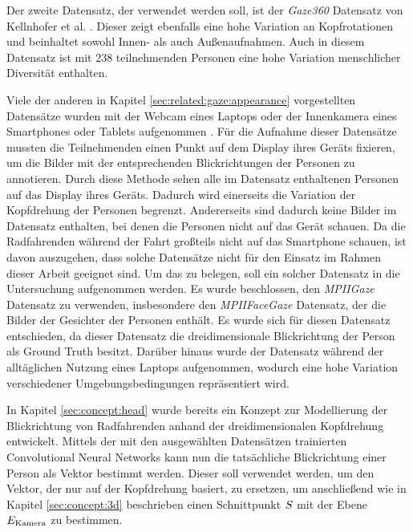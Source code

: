 Der zweite Datensatz, der verwendet werden soll, ist der \textit{Gaze360} Datensatz von Kellnhofer et al. \cite{paper:gaze360}. Dieser zeigt ebenfalls eine hohe Variation an Kopfrotationen und beinhaltet sowohl Innen- als auch Außenaufnahmen. Auch in diesem Datensatz ist mit 238 teilnehmenden Personen eine hohe Variation menschlicher Diversität enthalten.

Viele der anderen in Kapitel \ref{sec:related:gaze:appearance} vorgestellten Datensätze wurden mit der Webcam eines Laptops oder der Innenkamera eines Smartphones oder Tablets aufgenommen \cite{paper:mpiigaze, paper:gazecapture, paper:tabletgaze}. Für die Aufnahme dieser Datensätze mussten die Teilnehmenden einen Punkt auf dem Display ihres Geräts fixieren, um die Bilder mit der entsprechenden Blickrichtungen der Personen zu annotieren. Durch diese Methode sehen alle im Datensatz enthaltenen Personen auf das Display ihres Geräts. Dadurch wird einerseits die Variation der Kopfdrehung der Personen begrenzt. Andererseits sind dadurch keine Bilder im Datensatz enthalten, bei denen die Personen nicht auf das Gerät schauen. Da die Radfahrenden während der Fahrt großteils nicht auf das Smartphone schauen, ist davon auszugehen, dass solche Datensätze nicht für den Einsatz im Rahmen dieser Arbeit geeignet sind. Um das zu belegen, soll ein solcher Datensatz in die Untersuchung aufgenommen werden. Es wurde beschlossen, den \textit{MPIIGaze} \cite{paper:mpiigaze} Datensatz zu verwenden, insbesondere den \textit{MPIIFaceGaze} Datensatz, der die Bilder der Gesichter der Personen \cite{paper:mpiifacegaze} enthält. Es wurde sich für diesen Datensatz entschieden, da dieser Datensatz die dreidimensionale Blickrichtung der Person als Ground Truth besitzt. Darüber hinaus wurde der Datensatz während der alltäglichen Nutzung eines Laptops aufgenommen, wodurch eine hohe Variation verschiedener Umgebungsbedingungen repräsentiert wird.
 
In Kapitel \ref{sec:concept:head} wurde bereits ein Konzept zur Modellierung der Blickrichtung von Radfahrenden anhand der dreidimensionalen Kopfdrehung entwickelt. Mittels der mit den ausgewählten Datensätzen trainierten Convolutional Neural Networks kann nun die tatsächliche Blickrichtung einer Person als Vektor bestimmt werden. Dieser soll verwendet werden, um den Vektor, der nur auf der Kopfdrehung basiert, zu ersetzen, um anschließend wie in Kapitel \ref{sec:concept:3d} beschrieben einen Schnittpunkt $S$ mit der Ebene $E_{\text{Kamera}}$ zu bestimmen.

